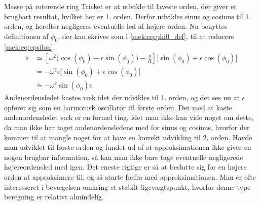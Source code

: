 \documentclass[crop=false, class=memoir]{standalone}
\begin{document}
\begin{opgave}[3]{Masse på roterende ring}
%
Tricket er at udvikle til laveste orden, der giver et brugbart resultat, hvilket her er 1. orden. Derfor udvikles sinus og cosinus til 1. orden, og herefter negligeres eventuelle led af højere orden. Nu benyttes definitionen af $\phi_0$, der kan skrives som i \cref{mek:eq:phi0_def}, til at reducere \cref{mek:eq:epsilon}.
%
\begin{align*}
	\ddot{\epsilon} &\simeq \left[\omega^2\Big(\cos(\phi_0) - \epsilon\sin(\phi_0)\Big) - \frac{g}{R}\right]\Big[\sin(\phi_0) + \epsilon\cos(\phi_0)\Big] \\
	&= -\omega^2\epsilon\Big[\sin(\phi_0) + \epsilon\cos(\phi_0)\Big] \\
	&\simeq -\omega^2\sin(\phi_0)\epsilon.
\end{align*}
%
Andenordensledet kastes væk idet der udvikles til 1. orden, og det ses nu at $\epsilon$ opfører sig som en harmonisk oscillator til første orden. Det med at kaste andenordensledet væk er en formel ting, idet man ikke kan vide noget om dette, da man ikke har taget andenordensledene med for sinus og cosinus, hvorfor der kommer til at mangle noget for at have en korrekt udvikling til 2. orden. Havde man udviklet til første orden og fundet ud af at approksimationen ikke giver en nogen brugbar information, så kan man ikke bare tage eventuelle negligerede højereordensled med igen. Det eneste rigtige er så at beslutte sig for en højere orden at approksimere til, og så starte forfra med approksimationen. Man er ofte interesseret i bevægelsen omkring et stabilt ligevægtspunkt, hvorfor denne type beregning er relativt almindelig.
\end{opgave}
\end{document}
